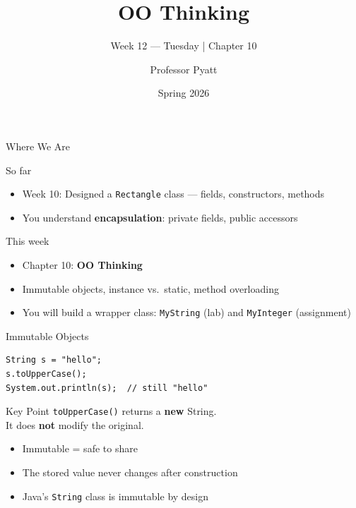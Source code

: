 \documentclass{beamer}
\title{OO Thinking}
\subtitle{Week 12 — Tuesday | Chapter 10}
\author{Professor Pyatt}
\institute{COP 2250 — Java Programming | Pyatt Labs @ SCF}
\date{Spring 2026}
\begin{document}
\begin{frame}
  \titlepage
\end{frame}

\begin{frame}{Where We Are}
  \begin{block}{So far}
    \begin{itemize}
      \item Week 10: Designed a \texttt{Rectangle} class — fields, constructors, methods
      \item You understand \textbf{encapsulation}: private fields, public accessors
    \end{itemize}
  \end{block}
  \begin{block}{This week}
    \begin{itemize}
      \item Chapter 10: \textbf{OO Thinking}
      \item Immutable objects, instance vs.\ static, method overloading
      \item You will build a wrapper class: \texttt{MyString} (lab) and \texttt{MyInteger} (assignment)
    \end{itemize}
  \end{block}
\end{frame}

\begin{frame}[fragile]{Immutable Objects}
  \begin{lstlisting}
String s = "hello";
s.toUpperCase();
System.out.println(s);  // still "hello"
  \end{lstlisting}
  \begin{block}{Key Point}
    \texttt{toUpperCase()} returns a \textbf{new} String.\\
    It does \textbf{not} modify the original.
  \end{block}
  \begin{itemize}
    \item Immutable = safe to share
    \item The stored value never changes after construction
    \item Java's \texttt{String} class is immutable by design
  \end{itemize}
\end{frame}
\end{document}
